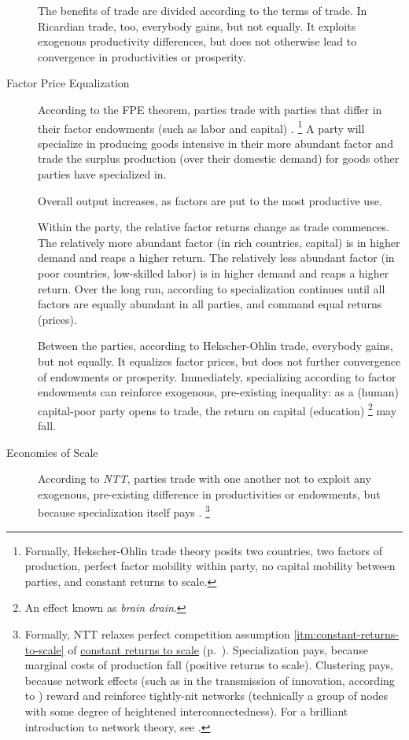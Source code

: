 \begin{description}
	The benefits of trade are divided according to the terms of trade.
	In Ricardian trade, too, everybody gains, but not equally.
	It exploits exogenous productivity differences, but does not otherwise lead to convergence in productivities or prosperity.


	\item[Factor Price Equalization]
	\label{itm:FPE}
	According to the \gls{FPE} theorem, parties trade with parties that differ in their factor endowments (such as labor and capital) \citep{Stolper1941}.
	\footnote{
		Formally, Hekscher-Ohlin trade theory posits two countries, two factors of production, perfect factor mobility within party, no capital mobility between parties, and constant returns to scale.
	}
	A party will specialize in producing goods intensive in their more abundant factor and trade the surplus production (over their domestic demand) for goods other parties have specialized in.

	Overall output increases, as factors are put to the most productive use.

	Within the party, the relative factor returns change as trade commences.
	The relatively more abundant factor (in rich countries, capital) is in higher demand and reaps a higher return.
	The relatively less abundant factor (in poor countries, low-skilled labor) is in higher demand and reaps a higher return.
	Over the long run, according to \cite{Stolper1941} specialization continues until all factors are equally abundant in all parties, and command equal returns (prices).

	Between the parties, according to Hekscher-Ohlin trade, everybody gains, but not equally.
	It equalizes factor prices, but does not further convergence of endowments or prosperity.
	Immediately, specializing according to factor endowments can reinforce exogenous, pre-existing inequality:
	as a (human) capital-poor party opens to trade, the return on capital (education)
	\footnote{
		An effect known as \emph{brain drain}.
	}
	may fall.

	\item[Economies of Scale]
	\label{itm:NTT}
	According to \emph{\gls{NTT}}, parties trade with one another not to exploit any exogenous, pre-existing difference in productivities or endowments, but because specialization itself pays \citep{Krugman-1980-aa}.
	\footnote{
		Formally, \gls{NTT} relaxes perfect competition assumption \ref{itm:constant-returns-to-scale} of \hyperref[itm:constant-returns-to-scale]{constant returns to scale} (p.~\pageref{itm:constant-returns-to-scale}).
		Specialization pays, because marginal costs of production fall (positive returns to scale).
		Clustering pays, because network effects (such as in the transmission of innovation, according to \citealt{Bass1969}) reward and reinforce tightly-nit networks (technically a group of nodes with some degree of heightened interconnectedness).
		For a brilliant introduction to network theory, see \cite{Kleinberg-2009-oz}.
	}


\end{description}
